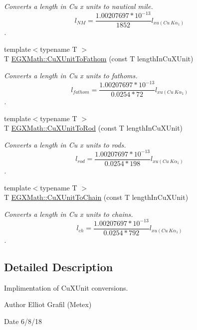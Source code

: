 \begin{DoxyCompactItemize}
\begin{DoxyCompactList}\small\item\em Converts a length in Cu x units to nautical mile. \[ l_{NM}= \frac{1.00207697*10^{-13}}{1852} l_{xu(Cu\ K\alpha_1)} \]. \end{DoxyCompactList}\item 
{\footnotesize template$<$typename T $>$ }\\T \mbox{\hyperlink{group___e_g_x_math-_conversions-_length_conversions-_non-_s_i-_cu_x_unit-_nautical_ga7a3671693beab30a832008ca1294732f}{E\+G\+X\+Math\+::\+Cu\+X\+Unit\+To\+Fathom}} (const T length\+In\+Cu\+X\+Unit)
\begin{DoxyCompactList}\small\item\em Converts a length in Cu x units to fathoms. \[ l_{fathom}= \frac{1.00207697*10^{-13}}{0.0254 * 72} l_{xu(Cu\ K\alpha_1)} \]. \end{DoxyCompactList}\item 
{\footnotesize template$<$typename T $>$ }\\T \mbox{\hyperlink{group___e_g_x_math-_conversions-_length_conversions-_non-_s_i-_cu_x_unit-_surveyors_ga3506ca573e8ba770792a7cf123bceb79}{E\+G\+X\+Math\+::\+Cu\+X\+Unit\+To\+Rod}} (const T length\+In\+Cu\+X\+Unit)
\begin{DoxyCompactList}\small\item\em Converts a length in Cu x units to rods. \[ l_{rod}= \frac{1.00207697*10^{-13}}{0.0254 * 198} l_{xu(Cu\ K\alpha_1)} \]. \end{DoxyCompactList}\item 
{\footnotesize template$<$typename T $>$ }\\T \mbox{\hyperlink{group___e_g_x_math-_conversions-_length_conversions-_non-_s_i-_cu_x_unit-_surveyors_ga504934f43d4950cb582134d718952f3b}{E\+G\+X\+Math\+::\+Cu\+X\+Unit\+To\+Chain}} (const T length\+In\+Cu\+X\+Unit)
\begin{DoxyCompactList}\small\item\em Converts a length in Cu x units to chains. \[ l_{ch}= \frac{1.00207697*10^{-13}}{0.0254 * 792} l_{xu(Cu\ K\alpha_1)} \]. \end{DoxyCompactList}\end{DoxyCompactItemize}


\subsection{Detailed Description}
Implimentation of Cu\+X\+Unit conversions. 

\begin{DoxyAuthor}{Author}
Elliot Grafil (Metex) 
\end{DoxyAuthor}
\begin{DoxyDate}{Date}
6/8/18 
\end{DoxyDate}
